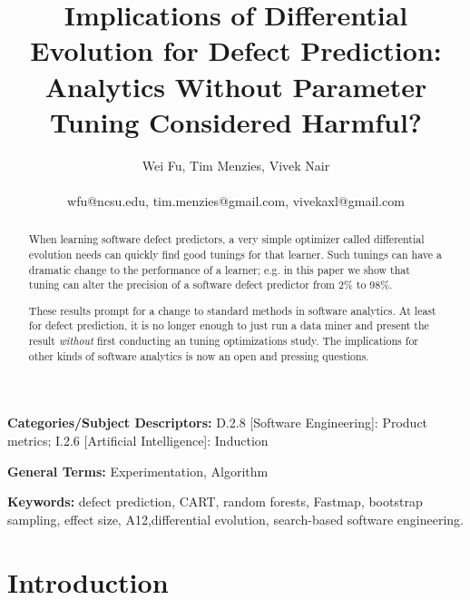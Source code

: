 \documentclass{sig-alternative}
\begin{document}
\title{Implications of Differential Evolution for  Defect Prediction:
Analytics Without Parameter Tuning Considered Harmful?}
\author{
\alignauthor
Wei Fu, Tim Menzies, Vivek Nair\\
       \\
       {wfu@ncsu.edu, tim.menzies@gmail.com, vivekaxl@gmail.com}} 


 
\maketitle
\begin{abstract}
When learning
software defect predictors,   a
very simple optimizer called differential evolution needs can quickly
find  good tunings for that learner.
Such tunings can have a dramatic change to the performance of a learner;
e.g. in this paper we show that tuning can alter the precision of
a software defect predictor from 2\% to 98\%.

These results prompt for a change to standard methods in software analytics.
At least for defect prediction, 
it is no longer enough to just run a data miner and present the result
{\em without} first conducting an tuning optimizations study.
The implications for other kinds of software analytics is now an open and pressing questions.


\end{abstract}

\vspace{1mm}
\noindent
{\bf Categories/Subject Descriptors:} 
D.2.8 [Software Engineering]: Product metrics;
I.2.6 [Artificial Intelligence]: Induction

\vspace{1mm}
\noindent
{\bf General Terms:} Experimentation, Algorithm

\vspace{1mm}
\noindent
{\bf Keywords:} defect prediction, CART, random forests,
Fastmap,   bootstrap sampling, effect size, A12,differential evolution,
search-based software engineering.

\section{Introduction}
\end{document}
